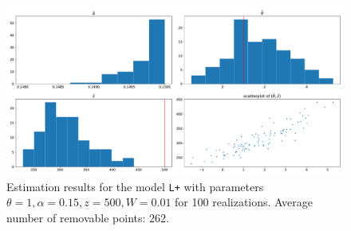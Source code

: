 \begin{figure}
  \centering
  \includegraphics[width=1\textwidth]{"../img/numeric/estimation - type_L+_theta_1"}
  \caption{Estimation results for the model \texttt{L+} with parameters $\theta=1,\alpha=0.15,z=500,W=0.01$ for 100 realizations. Average number of removable points: $262$.}
  \label{fig:estL1}
\end{figure}




